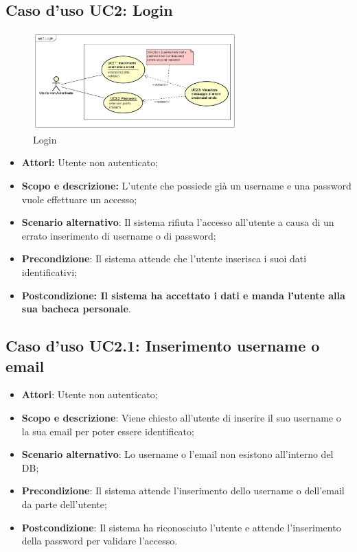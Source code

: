 \documentclass[12pt,a4paper,titlepage]{article}
\begin{document}
	\subsection{Caso d'uso UC2: Login}
	\label{UC2}
	\begin{figure}[H]
		\centering
		\includegraphics[width=0.7\textwidth]{UseCase/Login}
		\caption{Login}
	\end{figure}
	\begin{itemize}
		\item \textbf{Attori:} Utente non autenticato;
		\item \textbf{Scopo e descrizione:} L'utente che possiede già un username e una password vuole effettuare un accesso;
		\item \textbf{Scenario alternativo}: Il sistema rifiuta l'accesso all'utente a causa di un errato inserimento di username o di password;
		\item \textbf{Precondizione}: Il sistema attende che l'utente inserisca i suoi dati identificativi;
		\item \textbf{Postcondizione: Il sistema ha accettato i dati e manda l'utente alla sua bacheca personale}.
	\end{itemize}

	\subsection{Caso d'uso UC2.1: Inserimento username o email}
	\label{UC2.1}
	\begin{itemize}
		\item \textbf{Attori}: Utente non autenticato;
		\item \textbf{Scopo e descrizione}: Viene chiesto all'utente di inserire il suo username o la sua email per poter essere identificato;
		\item \textbf{Scenario alternativo}: Lo username o l'email non esistono all'interno del DB;
		\item \textbf{Precondizione}: Il sistema attende l'inserimento dello username o dell'email da parte dell'utente;
		\item \textbf{Postcondizione}: Il sistema ha riconosciuto l'utente e attende l'inserimento della password per validare l'accesso.
	\end{itemize}
\end{document}
